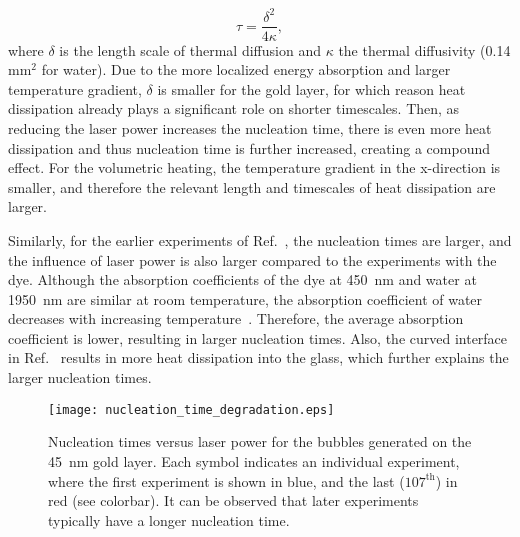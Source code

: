 \documentclass[11pt]{article}
\begin{document}
\begin{equation}
	\tau = \frac{\delta^2}{4\kappa},
\end{equation}
where $\delta$ is the length scale of thermal diffusion and $\kappa$ the thermal diffusivity (0.14 mm$^{2}$ for water). Due to the more localized energy absorption and larger temperature gradient, $\delta$ is smaller for the gold layer, for which reason heat dissipation already plays a significant role on shorter timescales. Then, as reducing the laser power increases the nucleation time, there is even more heat dissipation and thus nucleation time is further increased, creating a compound effect. For the volumetric heating, the temperature gradient in the x-direction is smaller, and therefore the relevant length and timescales of heat dissipation are larger. 

Similarly, for the earlier experiments of Ref.~\cite{Schoppink2024}, the nucleation times are larger, and the influence of laser power is also larger compared to the experiments with the dye. Although the absorption coefficients of the dye at 450~nm and water at 1950~nm are similar at room temperature, the absorption coefficient of water decreases with increasing temperature~\cite{Schoppink2024}. Therefore, the average absorption coefficient is lower, resulting in larger nucleation times. Also, the curved interface in Ref.~\cite{Schoppink2024} results in more heat dissipation into the glass, which further explains the larger nucleation times.

\begin{figure}[b!]
	\centering
	\texttt{[image: nucleation\_time\_degradation.eps]}
	\caption{Nucleation times versus laser power for the bubbles generated on the 45~nm gold layer. Each symbol indicates an individual experiment, where the first experiment is shown in blue, and the last ($107^{\textrm{th}}$) in red (see colorbar). It can be observed that later experiments typically have a longer nucleation time.}
	\label{C4: fig: nucleation time degradation}
\end{figure}
\end{document}
